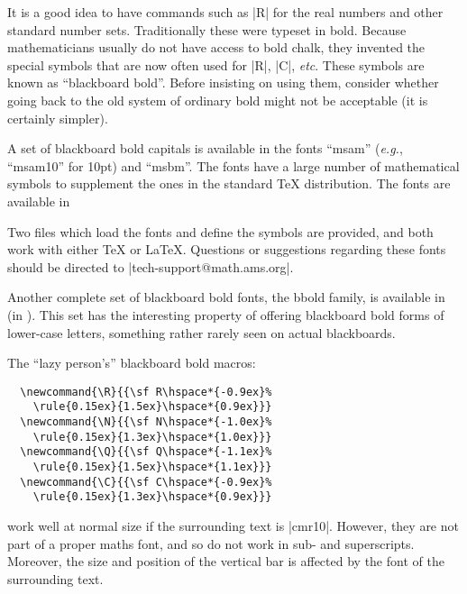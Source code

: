 
It is a good idea to have commands such as \cs|R| for the real numbers and
other standard number sets. Traditionally these were typeset in bold.
Because mathematicians usually do not have access to bold chalk, they
invented the special symbols that are now often used for \cs|R|, \cs|C|,
\emph{etc}.  These symbols are known as ``blackboard bold''. Before
insisting on using them, consider whether going back to the old system
of ordinary bold might not be acceptable (it is certainly simpler).

A set of blackboard bold capitals is available in the  fonts
``msam'' (\emph{e.g.}, ``msam10'' for 10pt) and ``msbm''. The fonts
have a large number of mathematical symbols to supplement the ones in
the standard \TeX{} distribution. The fonts are available in

Two files which load the fonts and define the symbols are provided,
and both work with either \TeX{} or \LaTeX{}.  Questions or
suggestions regarding these fonts should be directed to
\Email|tech-support@math.ams.org|.

Another complete set of blackboard bold fonts, the bbold family, is
available in \MF{} (in ).  This set has the interesting
property of offering blackboard bold forms of lower-case letters,
something rather rarely seen on actual blackboards.

The ``lazy person's'' blackboard bold macros:
\begin{verbatim}
  \newcommand{\R}{{\sf R\hspace*{-0.9ex}%
    \rule{0.15ex}{1.5ex}\hspace*{0.9ex}}}
  \newcommand{\N}{{\sf N\hspace*{-1.0ex}%
    \rule{0.15ex}{1.3ex}\hspace*{1.0ex}}}
  \newcommand{\Q}{{\sf Q\hspace*{-1.1ex}%
    \rule{0.15ex}{1.5ex}\hspace*{1.1ex}}}
  \newcommand{\C}{{\sf C\hspace*{-0.9ex}%
    \rule{0.15ex}{1.3ex}\hspace*{0.9ex}}}
\end{verbatim}
work well at normal size if the surrounding text is |cmr10|. However, 
they are not part of a proper maths font, and so do not work in sub- and 
superscripts. Moreover, the size and position of the vertical bar is 
affected by the font of the surrounding text.
%

